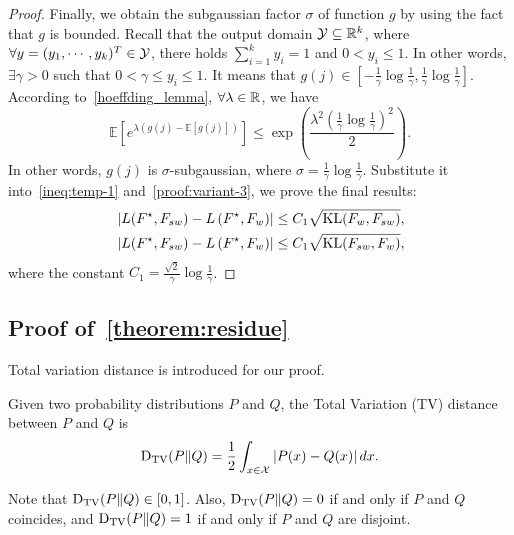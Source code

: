 \begin{proof}
Finally, we obtain the subgaussian factor $\sigma$ of function $g$ by using the fact that $g$ is bounded.
Recall that the output domain $\mathcal{Y} \subseteq \mathbb{R}^k$, where $\forall y = (y_1, \cdots, y_k)^T \in \mathcal{Y}$, there holds $\sum_{i=1}^k y_i=1$ and $0 < y_i \le 1$.
In other words, $\exists \gamma>0$ such that $0 < \gamma \le y_i \le 1$.
It means that $g(j) \in [-\frac{1}{\gamma} \log \frac{1}{\gamma}, \frac{1}{\gamma} \log \frac{1}{\gamma}]$.
According to~\cref{hoeffding_lemma}, $\forall \lambda \in \mathbb{R}$, we have
$$\mathbb{E}\left[e^{\lambda(g(j)-\mathbb{E}[g(j)])}\right] \leq \exp \left(\frac{\lambda^2 \left(\frac{1}{\gamma} \log \frac{1}{\gamma} \right)^2}{2}\right).$$
In other words, $g(j)$ is $\sigma$-subgaussian, where $\sigma=\frac{1}{\gamma} \log \frac{1}{\gamma}$.
Substitute it into~\eqref{ineq:temp-1} and~\eqref{proof:variant-3}, we prove the final results:
\begin{align*}
    & \left| L(F^\star, F_{sw}) - L\left( F^\star, F_w  \right) \right| \le C_1 \sqrt{\mathrm{KL}(F_w, F_{sw})}, \\
    & \left| L(F^\star, F_{sw}) - L\left( F^\star, F_w  \right) \right| \le C_1 \sqrt{\mathrm{KL}(F_{sw}, F_w)},
\end{align*}
where the constant $C_1 = \frac{\sqrt{2}}{\gamma} \log \frac{1}{\gamma}$.

\end{proof}

















\subsection{Proof of~\cref{theorem:residue}} \label{constant:theorem}

Total variation distance is introduced for our proof.
\begin{definition} \label{def:tv_distance}
Given two probability distributions $P$ and $Q$, the Total Variation (TV) distance between $P$ and $Q$ is
$$\mathrm{D}_{\mathrm{TV}}(P \| Q)= \frac{1}{2} \int_{x \in \mathcal{X}} \left| P(x)-Q(x) \right| d x.$$
\end{definition}
Note that $\mathrm{D}_{\mathrm{TV}}(P \| Q)\in[0,1]$. Also, $\mathrm{D}_{\mathrm{TV}}(P \| Q)=0$ if and only if $P$ and $Q$ coincides, and $\mathrm{D}_{\mathrm{TV}}(P \| Q)=1$ if and only if $P$ and $Q$ are disjoint.


